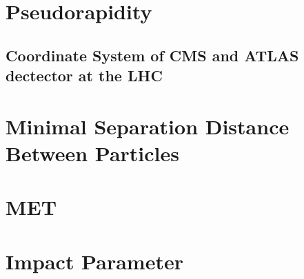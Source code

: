  \section{Pseudorapidity}
 
 \subsection{Coordinate System of CMS and ATLAS dectector at the LHC}
 
 \section{Minimal Separation Distance Between Particles}
 
 \section{MET}

 
 \section{Impact Parameter}

 
 